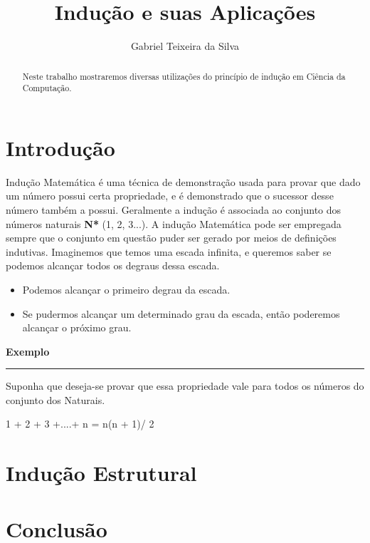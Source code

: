 \documentclass[a4paper, 10pt]{article}
\title{\LARGE \bf
 Indução e suas Aplicações
}
\author{Gabriel Teixeira da Silva}
\begin{document}
\maketitle

\begin{abstract}

Neste trabalho mostraremos diversas utilizações do princípio de indução em Ciência da Computação.

\end{abstract}

\section{Introdução}
Indução Matemática é uma técnica de demonstração usada para provar que dado um número possui certa propriedade, e é demonstrado que o sucessor desse número também a possui. Geralmente a indução é associada ao conjunto dos números naturais \textbf{N*} (1, 2, 3...). A indução Matemática pode ser empregada sempre que o conjunto em questão puder ser gerado por meios de definições indutivas.
Imaginemos que temos uma escada infinita, e queremos saber se podemos alcançar todos os degraus dessa escada.
\begin{itemize}
\item Podemos alcançar o primeiro degrau da escada.
\item Se pudermos alcançar um determinado grau da escada, então poderemos alcançar o próximo grau.
\end{itemize}
\begin{description}
\item \textbf{Exemplo}
  \hrule
\end{description}
Suponha que deseja-se provar que essa propriedade vale para todos os números do conjunto dos Naturais.
\begin{center}
  1 + 2 + 3 +....+ n = n(n + 1)/ 2
\end{center}
\section{Indução Estrutural}


\section{Conclusão}
\end{document}
